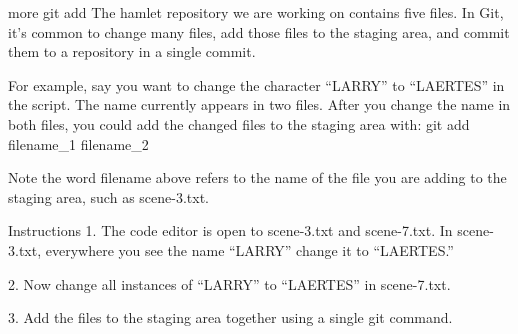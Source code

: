 more git add
    The hamlet repository we are working on contains five files. In Git, it’s common to change many files, add those files to the staging area, and commit them to a repository in a single commit.

    For example, say you want to change the character “LARRY” to “LAERTES” in the script. The name currently appears in two files. After you change the name in both files, you could add the changed files to the staging area with:
        git add filename_1 filename_2
    
    Note the word filename above refers to the name of the file you are adding to the staging area, such as scene-3.txt.

Instructions
    1.
    The code editor is open to scene-3.txt and scene-7.txt. In scene-3.txt, everywhere you see the name “LARRY” change it to “LAERTES.”

    2.
    Now change all instances of “LARRY” to “LAERTES” in scene-7.txt.

    3.
    Add the files to the staging area together using a single git command.